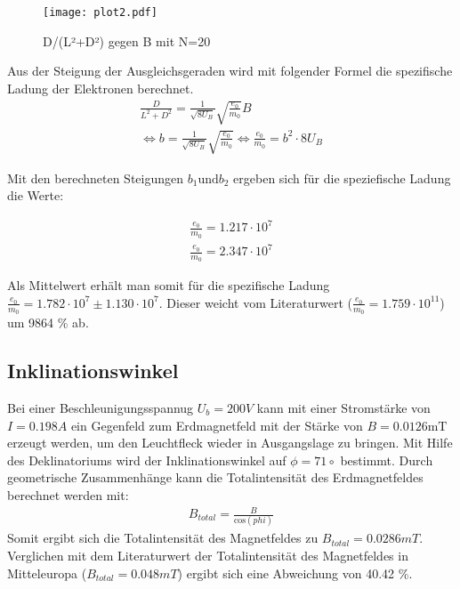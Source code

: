 \FloatBarrier
\begin{figure}
  \centering
  \texttt{[image: plot2.pdf]}
  \caption{D/(L²+D²) gegen B mit N=20}
  \label{fig:plot3}
\end{figure}

Aus der Steigung der Ausgleichsgeraden wird mit folgender Formel die spezifische Ladung der Elektronen berechnet.
\begin{align*}
  \frac{D}{L^2+D^2} = \frac{1}{\sqrt{8 U_B}} \sqrt{\frac{e_0}{m_0}} B \\
  \Leftrightarrow b = \frac{1}{\sqrt{8 U_B}}\sqrt{\frac{e_0}{m_0}}
  \Leftrightarrow \frac{e_0}{m_0} = b^2 \cdot 8 U_B
\end{align*}

Mit den berechneten Steigungen $b_1 \text{und} b_2$ ergeben sich für die speziefische Ladung die Werte:

\begin{align*}
  \frac{e_0}{m_0} = 1.217 \cdot 10^7 \\
  \frac{e_0}{m_0} = 2.347 \cdot 10^7
\end{align*}

Als Mittelwert erhält man somit für die spezifische Ladung $\frac{e_0}{m_0} = 1.782 \cdot 10^7 \pm 1.130 \cdot 10^7 $.
Dieser weicht vom Literaturwert ($\frac{e_0}{m_0} = 1.759 \cdot 10^11$) um 9864 \% ab.

\subsection{Inklinationswinkel}
\label{inklination}

Bei einer Beschleunigungsspannug $U_b = 200V$ kann mit einer Stromstärke von $I = 0.198 A$ ein Gegenfeld zum Erdmagnetfeld mit der Stärke von $B = 0.0126 \text{mT}$ erzeugt werden, um den Leuchtfleck wieder in Ausgangslage zu bringen.
Mit Hilfe des Deklinatoriums wird der Inklinationswinkel auf $\phi = 71 \circ$ bestimmt.
Durch geometrische Zusammenhänge kann die Totalintensität des Erdmagnetfeldes berechnet werden mit:
\begin{align*}
  B_{total} = \frac{B}{\text{cos}(phi)}
\end{align*}
Somit ergibt sich die Totalintensität des Magnetfeldes zu $B_{total} = 0.0286 mT$.
Verglichen mit dem Literaturwert der Totalintensität des Magnetfeldes in Mitteleuropa ($B_{total} = 0.048 mT$) ergibt sich eine Abweichung von 40.42 \%.
